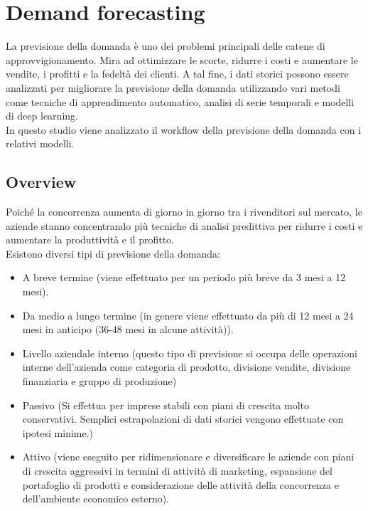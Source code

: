 \documentclass[12pt,a4paper]{report}
\begin{document}
\chapter{Demand forecasting}
La previsione della domanda è uno dei problemi principali delle catene di approvvigionamento. Mira ad ottimizzare le scorte, ridurre i costi e aumentare le vendite, i profitti e la fedeltà dei clienti. A tal fine, i dati storici possono essere analizzati per migliorare la previsione della domanda utilizzando vari metodi come tecniche di apprendimento automatico, analisi di serie temporali e modelli di deep learning.\\
In questo studio viene analizzato il workflow della previsione della domanda con i relativi modelli. 

\section{Overview}
Poiché la concorrenza aumenta di giorno in giorno tra i rivenditori sul mercato, le aziende stanno concentrando più tecniche di analisi predittiva per ridurre i costi e aumentare la produttività e il profitto.\\
Esistono diversi tipi di previsione della domanda: \cite{towards:demandForecast}
\begin{itemize}
    \item A breve termine (viene effettuato per un periodo più breve da 3 mesi a 12 mesi). 
    \item Da medio a lungo termine (in genere viene effettuato da più di 12 mesi a 24 mesi in anticipo (36-48 mesi in alcune attività)).
    \item Livello aziendale interno (questo tipo di previsione si occupa delle operazioni interne dell'azienda come categoria di prodotto, divisione vendite, divisione finanziaria e gruppo di produzione)
    \item Passivo (Si effettua per imprese stabili con piani di crescita molto conservativi. Semplici estrapolazioni di dati storici vengono effettuate con ipotesi minime.)
    \item Attivo (viene eseguito per ridimensionare e diversificare le aziende con piani di crescita aggressivi in termini di attività di marketing, espansione del portafoglio di prodotti e considerazione delle attività della concorrenza e dell'ambiente economico esterno).
\end{itemize}
\end{document}

